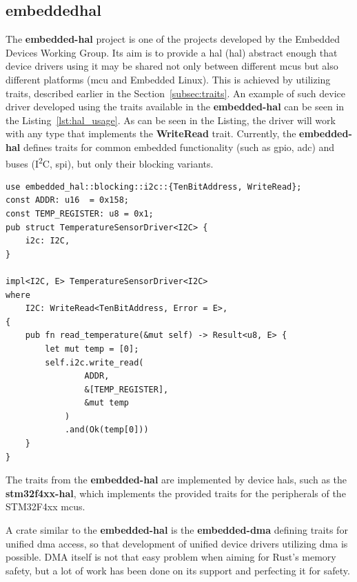 \subsection{embedded\textendash hal}
\label{subsec:embedded_hal}
The \textbf{embedded-hal} project\cite{rust_embedded_devices_wg_rust-embeddedembedded-hal_2021} is one of the projects developed by the Embedded Devices Working Group.
Its aim is to provide a \acs{hal} (\acl{hal}) abstract enough that device drivers using it may be shared not only between different \acs{mcu}s but also different platforms (\acs{mcu} and Embedded Linux).
This is achieved by utilizing traits, described earlier in the Section~\ref{subsec:traits}.
An example of such device driver developed using the traits available in the \textbf{embedded-hal} can be seen in the Listing~\ref{lst:hal_usage}.
As can be seen in the Listing, the driver will work with any type that implements the \textbf{WriteRead} trait.
Currently, the \textbf{embedded-hal} defines traits for common embedded functionality (such as \acs{gpio}, \acs{adc}) and buses (I\textsuperscript{2}C, \acs{spi}), but only their blocking variants.

\begin{lstlisting}[caption={Example of an device driver utilizing embedded-hal traits\cite{rust_embedded_devices_wg_rust-embeddedembedded-hal_2021}.},label=lst:hal_usage]
use embedded_hal::blocking::i2c::{TenBitAddress, WriteRead};
const ADDR: u16  = 0x158;
const TEMP_REGISTER: u8 = 0x1;
pub struct TemperatureSensorDriver<I2C> {
    i2c: I2C,
}

impl<I2C, E> TemperatureSensorDriver<I2C>
where
    I2C: WriteRead<TenBitAddress, Error = E>,
{
    pub fn read_temperature(&mut self) -> Result<u8, E> {
        let mut temp = [0];
        self.i2c.write_read(
                ADDR,
                &[TEMP_REGISTER],
                &mut temp
            )
            .and(Ok(temp[0]))
    }
}
\end{lstlisting}

The traits from the \textbf{embedded-hal} are implemented by device \acs{hal}s, such as the \textbf{stm32f4xx-hal}\cite{noauthor_stm32-rsstm32f4xx-hal_2021}, which implements the provided traits for the peripherals of the STM32F4xx \acs{mcu}s.

A crate similar to the \textbf{embedded-hal} is the \textbf{embedded-dma} defining traits for unified \acs{dma} access, so that development of unified device drivers utilizing \acs{dma} is possible.
DMA itself is not that easy problem when aiming for Rust's memory safety\cite{aparicio_memory_nodate}, but a lot of work has been done on its support and perfecting it for safety.

